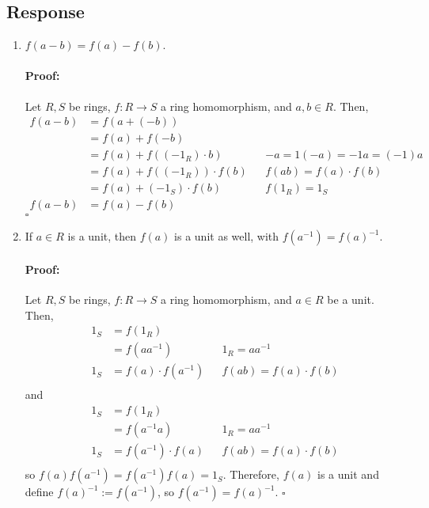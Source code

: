 \documentclass [12pt] {article}
\newenvironment{proof}{\paragraph{Proof:}}{\hfill$\square$}
\begin{document}
\subsection*{Response}
    \begin{enumerate}
        \item $f(a - b) = f(a) - f(b)$. \vspace{-12pt}

            \begin{proof}
                Let $R, S$ be rings, $f : R \to S$ a ring homomorphism, and $a, b \in R$. Then,
                \begin{align*}
                    f(a - b) &= f(a + (-b)) \\
                             &= f(a) + f(-b) \\
                             &= f(a) + f((-1_R) \cdot b) && -a = 1(-a) = -1a = (-1)a \\
                             &= f(a) + f((-1_R)) \cdot f(b) && f(ab) = f(a) \cdot f(b)\\
                             &= f(a) + (-1_S) \cdot f(b) && f(1_R) = 1_S \\
                    f(a - b) &= f(a) - f(b)
                \end{align*}
            \end{proof}        
        \item If $a\in R$ is a unit, then $f(a)$ is a unit as well, with $f(a^{-1})=f(a)^{-1}$. \vspace{-12pt}

            \begin{proof}
                Let $R, S$ be rings, $f : R \to S$ a ring homomorphism, and $a \in R$ be a unit. 
                Then,
                \begin{align*}
                    1_S &= f(1_R) \\
                        &= f(a a^{-1}) && 1_R = a a^{-1} \\
                    1_S &= f(a) \cdot f(a^{-1}) && f(ab) = f(a) \cdot f(b) \\
                \end{align*}
                and 
                \begin{align*}
                    1_S &= f(1_R) \\
                        &= f(a^{-1} a) && 1_R = a a^{-1} \\
                    1_S &= f(a^{-1}) \cdot f(a) && f(ab) = f(a) \cdot f(b) \\
                \end{align*}
                so $f(a) f(a^{-1}) = f(a^{-1})f(a) = 1_S$. Therefore, $f(a)$ is a unit and define
                $f(a)^{-1} := f(a^{-1})$, so $f(a^{-1}) = f(a)^{-1}$.
            \end{proof}
    \end{enumerate}
\newpage
\end{document}
